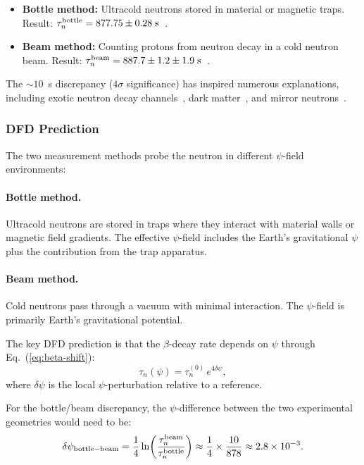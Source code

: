 \documentclass[aps,prb,twocolumn,superscriptaddress,floatfix,nofootinbib,longbibliography]{revtex4-2}
\begin{document}
\begin{itemize}[nosep]
\item \textbf{Bottle method:} Ultracold neutrons stored in material or
  magnetic traps. Result:
  $\tau_n^{\rm bottle} = 877.75 \pm 0.28\;\text{s}$~\cite{UCNtau2021}.
\item \textbf{Beam method:} Counting protons from neutron decay in a cold
  neutron beam. Result:
  $\tau_n^{\rm beam} = 887.7 \pm 1.2 \pm 1.9\;\text{s}$~\cite{Yue2013}.
\end{itemize}

The $\sim 10$~s discrepancy ($4\sigma$ significance) has inspired
numerous explanations, including exotic neutron decay
channels~\cite{Fornal2018}, dark matter~\cite{Berezhiani2019}, and
mirror neutrons~\cite{Broussard2019}.

\subsubsection{DFD Prediction}

The two measurement methods probe the neutron in different $\psi$-field
environments:

\paragraph{Bottle method.}
Ultracold neutrons are stored in traps where they interact with
material walls or magnetic field gradients.  The effective $\psi$-field
includes the Earth's gravitational $\psi$ plus the contribution from the
trap apparatus.

\paragraph{Beam method.}
Cold neutrons pass through a vacuum with minimal interaction.  The
$\psi$-field is primarily Earth's gravitational potential.

The key DFD prediction is that the $\beta$-decay rate depends on $\psi$
through Eq.~(\ref{eq:beta-shift}):
\begin{equation}
\tau_n(\psi) = \tau_n^{(0)}\,e^{4\delta\psi},
\label{eq:neutron-life-psi}
\end{equation}
where $\delta\psi$ is the local $\psi$-perturbation relative to a
reference.

For the bottle/beam discrepancy, the $\psi$-difference between the two
experimental geometries would need to be:
\begin{equation}
\delta\psi_{\rm bottle-beam} = \frac{1}{4}\ln\!\left(
\frac{\tau_n^{\rm beam}}{\tau_n^{\rm bottle}}\right)
\approx \frac{1}{4}\times\frac{10}{878} \approx 2.8 \times 10^{-3}.
\label{eq:psi-neutron}
\end{equation}
\end{document}
